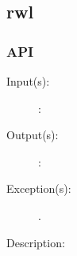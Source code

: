 %
%
%
%
%              

\subsection{rwl}
\label{rwl}

\subsubsection{API}
\begin{description}
\label{rwl_}
\item[{\cfunc[]{rwl\_}{}}: ]
	\begin{description}\item[]
	\item[Input(s): ]
		\begin{description}\item[]
		\item[: ]
		\end{description}
	\item[Output(s): ]
		\begin{description}\item[]
		\item[: ]
		\end{description}
	\item[Exception(s): ]
		\begin{description}\item[]
		\item[.]
		\end{description}
	\item[Description: ]
	\end{description}
\end{description}
